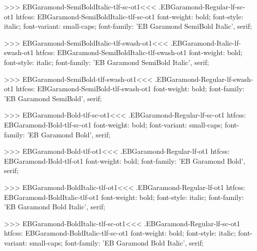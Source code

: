 {{{{{{{>>>
\<EBGaramond-SemiBoldItalic-tlf-sc-ot1\><<<
.EBGaramond-Regular-lf-sc-ot1
htfcss:  EBGaramond-SemiBoldItalic-tlf-sc-ot1  font-weight: bold; font-style: italic; font-variant: small-caps; font-family: 'EB Garamond SemiBold Italic', serif;

>>>
\<EBGaramond-SemiBoldItalic-tlf-swash-ot1\><<<
.EBGaramond-Italic-lf-swash-ot1
htfcss:  EBGaramond-SemiBoldItalic-tlf-swash-ot1  font-weight: bold; font-style: italic; font-family: 'EB Garamond SemiBold Italic', serif;

>>>
\<EBGaramond-SemiBold-tlf-swash-ot1\><<<
.EBGaramond-Regular-lf-swash-ot1
htfcss:  EBGaramond-SemiBold-tlf-swash-ot1  font-weight: bold; font-family: 'EB Garamond SemiBold', serif;

>>>
\<EBGaramond-Bold-tlf-sc-ot1\><<<
.EBGaramond-Regular-lf-sc-ot1
htfcss:  EBGaramond-Bold-tlf-sc-ot1  font-weight: bold; font-variant: small-caps; font-family: 'EB Garamond Bold', serif;

>>>
\<EBGaramond-Bold-tlf-ot1\><<<
.EBGaramond-Regular-lf-ot1
htfcss:  EBGaramond-Bold-tlf-ot1  font-weight: bold; font-family: 'EB Garamond Bold', serif;

>>>
\<EBGaramond-BoldItalic-tlf-ot1\><<<
.EBGaramond-Regular-lf-ot1
htfcss:  EBGaramond-BoldItalic-tlf-ot1  font-weight: bold; font-style: italic; font-family: 'EB Garamond Bold Italic', serif;

>>>
\<EBGaramond-BoldItalic-tlf-sc-ot1\><<<
.EBGaramond-Regular-lf-sc-ot1
htfcss:  EBGaramond-BoldItalic-tlf-sc-ot1  font-weight: bold; font-style: italic; font-variant: small-caps; font-family: 'EB Garamond Bold Italic', serif;

}}}}}}}
